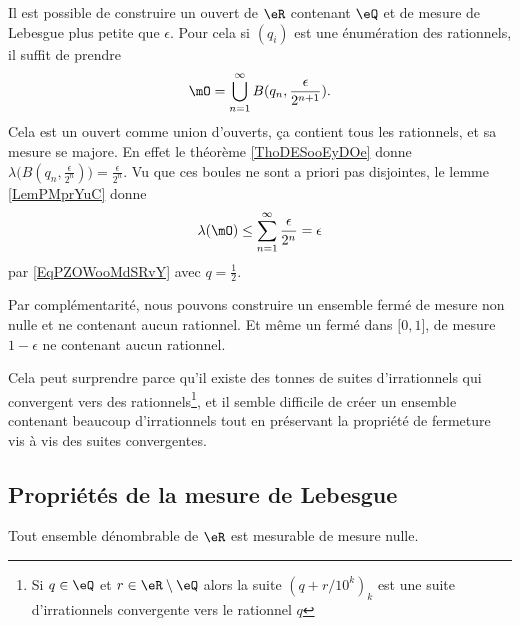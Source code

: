 \begin{example}
    Il est possible de construire un ouvert de $\eR$ contenant \( \eQ\) et de mesure de Lebesgue plus petite que \( \epsilon\). Pour cela si \( (q_i)\) est une énumération des rationnels, il suffit de prendre
    \begin{equation}
        \mO=\bigcup_{n=1}^{\infty}B(q_n,\frac{ \epsilon }{ 2^{n+1} }).
    \end{equation}
    Cela est un ouvert comme union d'ouverts, ça contient tous les rationnels, et sa mesure se majore. En effet le théorème \ref{ThoDESooEyDOe} donne \( \lambda\big( B(q_n,\frac{\epsilon }{ 2^n }) \big)=\frac{ \epsilon }{ 2^n }\). Vu que ces boules ne sont a priori pas disjointes, le lemme \ref{LemPMprYuC} donne 
    \begin{equation}
        \lambda(\mO) \leq \sum_{n=1}^{\infty}\frac{ \epsilon }{ 2^n }=\epsilon
    \end{equation}
    par \eqref{EqPZOWooMdSRvY} avec \( q=\frac{ 1 }{2}\).

    Par complémentarité, nous pouvons construire un ensemble fermé de mesure non nulle et ne contenant aucun rationnel. Et même un fermé dans \( \mathopen[ 0 , 1 \mathclose]\), de mesure \( 1-\epsilon\) ne contenant aucun rationnel. 
    
    Cela peut surprendre parce qu'il existe des tonnes de suites d'irrationnels qui convergent vers des rationnels\footnote{Si \( q\in \eQ\) et \( r\in \eR\setminus \eQ\) alors la suite \( (q+r/10^k)_k\) est une suite d'irrationnels convergente vers le rationnel \( q\)}, et il semble difficile de créer un ensemble contenant beaucoup d'irrationnels tout en préservant la propriété de fermeture vis à vis des suites convergentes.
\end{example}

\subsection{Propriétés de la mesure de Lebesgue}

\begin{proposition}
    Tout ensemble dénombrable de \( \eR\) est mesurable de mesure nulle.
\end{proposition}

